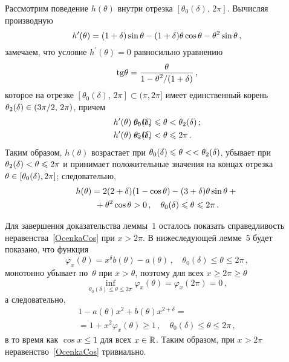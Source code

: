 \begin{multicols}{2}
Рассмотрим поведение $h(\theta)$ внутри отрезка
$[\theta_0(\delta),\,2\pi]$. Вычисляя производную
\begin{equation*}
h^\prime(\theta)=
(1+\delta)\sin\theta-(1+\delta)\theta\cos\theta-\theta^2\sin\theta\,,
\end{equation*}
замечаем, что условие $h^\prime(\theta)=0$ равносильно уравнению
$$
\rm tg \theta=\displaystyle\frac{\displaystyle \theta\mathstrut}{\displaystyle 1-\theta^2/(1+\delta)\mathstrut}\,,
$$
которое на отрезке $[\theta_0(\delta),\,2\pi]\subset(\pi,2\pi]$
имеет единственный корень ${\theta_2(\delta)\in(3\pi/2,\,2\pi)}$, причем
\begin{align*}
  h^\prime(\theta)&>0\,, & \hspace*{-30pt} \theta_0(\d)&\le\theta<\theta_2(\d)\,; \\
  h^\prime(\theta)&<0\,, & \hspace*{-30pt} \theta_2(\d)&<\theta\le2\pi\,.
\end{align*}
Таким образом, $h(\theta)$ возрастает при
$\theta_0(\delta)\leqslant\theta<$\linebreak $<\theta_2(\delta)$, убывает при
${\theta_2(\delta)<\theta\leqslant2\pi}$ и принимает положительные значения на
концах отрезка ${\theta\in[\theta_0(\delta),2\pi]}$; следовательно,
\begin{multline}
\label{OcenkaCos_h(theta)>0}
h(\theta)=2(2+\delta)(1-\cos\theta)-
(3+\delta)\theta\sin\theta+{}\\
{}+
\theta^2\cos\theta>0\,,\quad
\theta_0(\delta)\leqslant\theta\leqslant 2\pi\,.
\end{multline}

Для завершения доказательства леммы~1 осталось
показать справедливость неравенства~\eqref{OcenkaCos} при $x>2\pi$.
В нижеследующей лемме~5 будет показано, что функция
$$
\varphi_x(\theta)=x^{\delta}b(\theta)-a(\theta)\,,\quad
\theta_0(\delta)\le\theta\le2\pi\,,
$$
монотонно убывает по~$\theta$ при $x>\theta$, поэтому для всех
$x\ge2\pi\ge\theta$
$$
\inf_{\theta_0(\delta)\le\theta\le2\pi}\varphi_x(\theta) =
\varphi_x(2\pi)=0\,,
$$
а следовательно,
\begin{multline*}
1-a(\theta)x^2+b(\theta)x^{2+\delta}={}\\
{}=
1+x^2\varphi_x(\theta)\ge 1\,,\quad \theta_0(\delta)\le\theta\le2\pi\,,
\end{multline*}
в то время как $\cos x\le1$ для всех $x\in\mathbb R$.
Таким образом, при $x>2\pi$ неравенство~\eqref{OcenkaCos} тривиально.

\medskip


\end{multicols}
